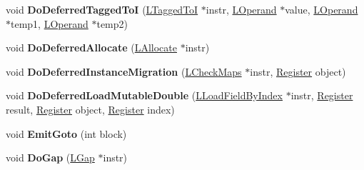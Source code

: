 \begin{DoxyCompactItemize}
\item 
void {\bfseries Do\+Deferred\+Tagged\+ToI} (\hyperlink{classv8_1_1internal_1_1_l_tagged_to_i}{L\+Tagged\+ToI} $\ast$instr, \hyperlink{classv8_1_1internal_1_1_l_operand}{L\+Operand} $\ast$value, \hyperlink{classv8_1_1internal_1_1_l_operand}{L\+Operand} $\ast$temp1, \hyperlink{classv8_1_1internal_1_1_l_operand}{L\+Operand} $\ast$temp2)\hypertarget{classv8_1_1internal_1_1_l_code_gen_a5fcb1fcca1eeb565261d7370e6245977}{}\label{classv8_1_1internal_1_1_l_code_gen_a5fcb1fcca1eeb565261d7370e6245977}

\item 
void {\bfseries Do\+Deferred\+Allocate} (\hyperlink{classv8_1_1internal_1_1_l_allocate}{L\+Allocate} $\ast$instr)\hypertarget{classv8_1_1internal_1_1_l_code_gen_a5a708933d9b086e295c8bf902f66033e}{}\label{classv8_1_1internal_1_1_l_code_gen_a5a708933d9b086e295c8bf902f66033e}

\item 
void {\bfseries Do\+Deferred\+Instance\+Migration} (\hyperlink{classv8_1_1internal_1_1_l_check_maps}{L\+Check\+Maps} $\ast$instr, \hyperlink{structv8_1_1internal_1_1_register}{Register} object)\hypertarget{classv8_1_1internal_1_1_l_code_gen_a9a11a557dc4a35165efe7432b91cce0c}{}\label{classv8_1_1internal_1_1_l_code_gen_a9a11a557dc4a35165efe7432b91cce0c}

\item 
void {\bfseries Do\+Deferred\+Load\+Mutable\+Double} (\hyperlink{classv8_1_1internal_1_1_l_load_field_by_index}{L\+Load\+Field\+By\+Index} $\ast$instr, \hyperlink{structv8_1_1internal_1_1_register}{Register} result, \hyperlink{structv8_1_1internal_1_1_register}{Register} object, \hyperlink{structv8_1_1internal_1_1_register}{Register} index)\hypertarget{classv8_1_1internal_1_1_l_code_gen_a9a814347358bb30ae26293358697e12f}{}\label{classv8_1_1internal_1_1_l_code_gen_a9a814347358bb30ae26293358697e12f}

\item 
void {\bfseries Emit\+Goto} (int block)\hypertarget{classv8_1_1internal_1_1_l_code_gen_a77ef06fc94dce505c88f628d129c114d}{}\label{classv8_1_1internal_1_1_l_code_gen_a77ef06fc94dce505c88f628d129c114d}

\item 
void {\bfseries Do\+Gap} (\hyperlink{classv8_1_1internal_1_1_l_gap}{L\+Gap} $\ast$instr)\hypertarget{classv8_1_1internal_1_1_l_code_gen_a349f26d8f5d21ea5ef25e7855317a575}{}\label{classv8_1_1internal_1_1_l_code_gen_a349f26d8f5d21ea5ef25e7855317a575}


\end{DoxyCompactItemize}

